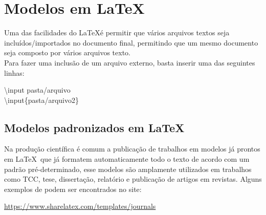 \section{Modelos em \LaTeX}

\begin{frame}
    Uma das facilidades do \LaTeX é  permitir que vários arquivos textos seja incluídos/importados no documento final, permitindo que um mesmo documento seja composto por vários arquivos texto.\\
    Para fazer uma inclusão de um arquivo externo, basta inserir uma das seguintes linhas:

\vspace{1cm}
\begin{center}
    {\ttfamily \textbackslash input {pasta/arquivo}}\\
    {\ttfamily \textbackslash input\{pasta/arquivo2\}}
\end{center}

\end{frame}


\begin{frame}
\subsection*{Modelos padronizados em \LaTeX} %

Na produção científica é comum a publicação de trabalhos em modelos já  prontos em \LaTeX~que já formatem automaticamente todo o texto de acordo com um padrão pré-determinado, esse modelos são amplamente utilizados em trabalhos como TCC, tese, dissertação, relatório e publicação de artigos em revistas. Alguns exemplos de podem ser encontrados no site:

\begin{center}
\url{https://www.sharelatex.com/templates/journals}
\end{center}
\end{frame}


